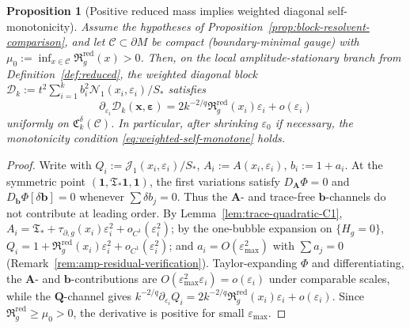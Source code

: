 \documentclass[11pt,reqno,a4paper]{amsart}
\numberwithin{equation}{section}
\theoremstyle{plain}
\newtheorem{proposition}[theorem]{Proposition}
\theoremstyle{remark}
\theoremstyle{plain}
\begin{document}
\begin{proposition}[Positive reduced mass implies weighted diagonal self-monotonicity]
\label{prop:weighted-self-monotone}
Assume the hypotheses of Proposition~\ref{prop:block-resolvent-comparison},
and let $\mathcal C\subset \partial M$ be compact (boundary-minimal gauge) with
$\mu_0:=\inf_{x\in\mathcal C}\mathfrak R_g^{\mathrm{red}}(x)>0$.
Then, on the local amplitude-stationary branch from Definition~\ref{def:reduced},
the weighted diagonal block
$\mathcal D_k:=t^2\sum_{i=1}^k b_i^2\mathcal N_1(x_i,\varepsilon_i)/S_\ast$
satisfies
\begin{equation}\label{eq:weighted-self-derivative}
\partial_{\varepsilon_i}\mathcal D_k(\mathbf x,\boldsymbol\varepsilon)
=
2k^{-2/q}\mathfrak R_g^{\mathrm{red}}(x_i)\varepsilon_i
+o(\varepsilon_i)
\end{equation}
uniformly on $\mathfrak C_k^\delta(\mathcal C)$.
In particular, after shrinking $\varepsilon_0$ if necessary,
the monotonicity condition \eqref{eq:weighted-self-monotone} holds.
\end{proposition}

\begin{proof}
Write 
with $Q_i:=\mathcal J_1(x_i,\varepsilon_i)/S_\ast$, $A_i:=A(x_i,\varepsilon_i)$,
$b_i:=1+a_i$.
At the symmetric point $(\mathbf 1,\mathfrak T_\ast\mathbf 1,\mathbf 1)$,
the first variations satisfy
$D_{\mathbf A}\Phi=0$
and $D_{\mathbf b}\Phi[\delta\mathbf b]=0$ whenever $\sum \delta b_j=0$.
Thus the $\mathbf A$- and trace-free $\mathbf b$-channels do not contribute at leading order.
By Lemma~\ref{lem:trace-quadratic-C1},
$A_i=\mathfrak T_\ast+\tau_{\partial,g}(x_i)\varepsilon_i^2+o_{C^1}(\varepsilon_i^2)$;
by the one-bubble expansion on $\{H_g=0\}$,
$Q_i=1+\mathfrak R_g^{\mathrm{red}}(x_i)\varepsilon_i^2+o_{C^1}(\varepsilon_i^2)$;
and $a_i=O(\varepsilon_{\max}^2)$ with $\sum a_j=0$
(Remark~\ref{rem:amp-residual-verification}).
Taylor-expanding $\Phi$ and differentiating, the $\mathbf A$- and $\mathbf b$-contributions
are $O(\varepsilon_{\max}^2\varepsilon_i)=o(\varepsilon_i)$ under comparable scales,
while the $\mathbf Q$-channel gives
$k^{-2/q}\partial_{\varepsilon_i}Q_i
=2k^{-2/q}\mathfrak R_g^{\mathrm{red}}(x_i)\varepsilon_i+o(\varepsilon_i)$.
Since $\mathfrak R_g^{\mathrm{red}}\ge\mu_0>0$, the derivative is positive for small $\varepsilon_{\max}$.
\end{proof}
\end{document}
